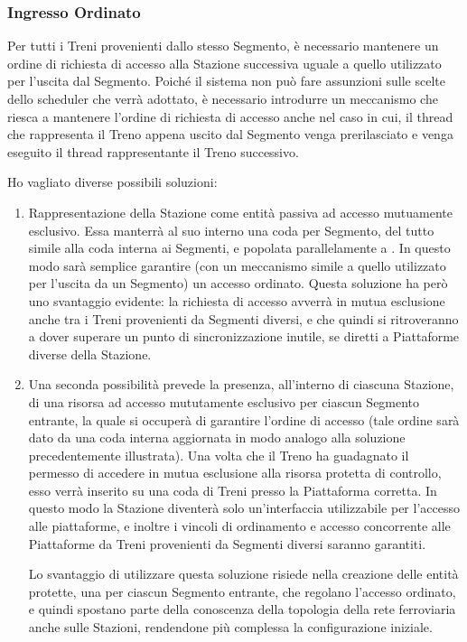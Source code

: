 		\subsubsection{Ingresso Ordinato}
		
		Per tutti i Treni provenienti dallo stesso Segmento, è necessario mantenere un ordine di richiesta di accesso alla Stazione successiva uguale a quello utilizzato per l'uscita dal Segmento. Poiché il sistema non può fare assunzioni sulle scelte dello scheduler che verrà adottato, è necessario introdurre un meccanismo che riesca a mantenere l'ordine di richiesta di accesso anche nel caso in cui, il thread che rappresenta il Treno appena uscito dal Segmento venga prerilasciato e venga eseguito il thread rappresentante il Treno successivo.

		Ho vagliato diverse possibili soluzioni:
		\begin{enumerate}
			\item Rappresentazione della Stazione come entità passiva ad accesso mutuamente esclusivo. Essa manterrà al suo interno una coda per Segmento, del tutto simile alla coda  interna ai Segmenti, e popolata parallelamente a . In questo modo sarà semplice garantire (con un meccanismo simile a quello utilizzato per l'uscita da un Segmento) un accesso ordinato. Questa soluzione ha però uno svantaggio evidente: la richiesta di accesso avverrà in mutua esclusione anche tra i Treni provenienti da Segmenti diversi, e che quindi si ritroveranno a dover superare un punto di sincronizzazione inutile, se diretti a Piattaforme diverse della Stazione.
			\item Una seconda possibilità prevede la presenza, all'interno di ciascuna Stazione, di una risorsa ad accesso mututamente esclusivo per ciascun Segmento entrante, la quale si occuperà di garantire l'ordine di accesso (tale ordine sarà dato da una coda interna aggiornata in modo analogo alla soluzione precedentemente illustrata). Una volta che il Treno ha guadagnato il permesso di accedere in mutua esclusione alla risorsa protetta di controllo, esso verrà inserito su una coda di Treni presso la Piattaforma corretta.
			In questo modo la Stazione diventerà solo un'interfaccia utilizzabile per l'accesso alle piattaforme, e inoltre i vincoli di ordinamento e accesso concorrente alle Piattaforme da Treni provenienti da Segmenti diversi saranno garantiti.
			
			Lo svantaggio di utilizzare questa soluzione risiede nella creazione delle entità protette, una per ciascun Segmento entrante, che regolano l'accesso ordinato, e quindi spostano parte della conoscenza della topologia della rete ferroviaria anche sulle Stazioni, rendendone più complessa la configurazione iniziale.
		\end{enumerate} 
		
